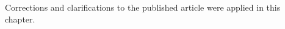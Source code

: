 \begin{chapterpreface}
Corrections and clarifications to the published article were applied in this chapter.
\end{chapterpreface}






